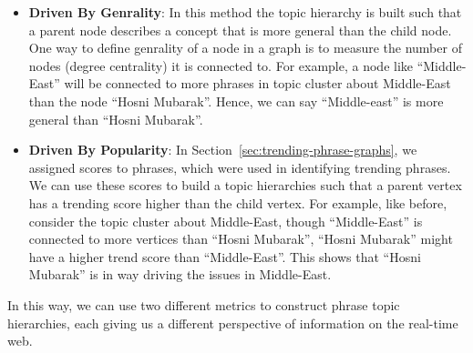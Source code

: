 \documentclass{sig-alternate}
\begin{document}
\begin{itemize}
\item \textbf{Driven By Genrality}: In this method the topic hierarchy is built such that a parent node describes a concept that is more general than the child node. One way to define genrality of a node in a graph is to measure the number of nodes (degree centrality) it is connected to. For example, a node like ``Middle-East'' will be connected to more phrases in topic cluster about Middle-East than the node ``Hosni Mubarak''. Hence, we can say ``Middle-east'' is more general than ``Hosni Mubarak''.  
\item \textbf{Driven By Popularity}: In Section~\ref{sec:trending-phrase-graphs}, we assigned scores to phrases, which were used in identifying trending phrases. We can use these scores to build a topic hierarchies such that a parent vertex has a trending score higher than the child vertex. For example, like before, consider the topic cluster about Middle-East, though ``Middle-East'' is connected to more vertices than ``Hosni Mubarak'', ``Hosni Mubarak'' might have a higher trend score than ``Middle-East''. This shows that ``Hosni Mubarak'' is in way driving the issues in Middle-East.
\end{itemize}
 
In this way, we can use two different metrics to construct phrase topic hierarchies, each giving us a different perspective of information on the real-time web.
\end{document}
